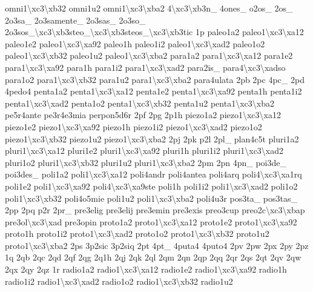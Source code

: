 {omni1\textbackslash{}xc3\textbackslash{}xb32 omni1u2 omni1\textbackslash{}xc3\textbackslash{}xba2 4\textbackslash{}xc3\textbackslash{}xb3n\-\_\- 4ones\-\_\- o2os\-\_\- 2os\-\_\- 2o3sa\-\_\- 2o3samente\-\_\- 2o3sas\-\_\- 2o3so\-\_\- 2o3sos\-\_\textbackslash{}xc3\textbackslash{}xb3steo\-\_\textbackslash{}xc3\textbackslash{}xb3steos\-\_\textbackslash{}xc3\textbackslash{}xb3tic 1p paleo1a2 paleo1\textbackslash{}xc3\textbackslash{}xa12 paleo1e2 paleo1\textbackslash{}xc3\textbackslash{}xa92 paleo1h paleo1i2 paleo1\textbackslash{}xc3\textbackslash{}xad2 paleo1o2 paleo1\textbackslash{}xc3\textbackslash{}xb32 paleo1u2 paleo1\textbackslash{}xc3\textbackslash{}xba2 para1a2 para1\textbackslash{}xc3\textbackslash{}xa12 para1e2 para1\textbackslash{}xc3\textbackslash{}xa92 para1h para1i2 para1\textbackslash{}xc3\textbackslash{}xad2 para2is\-\_\- para4\textbackslash{}xc3\textbackslash{}xadso para1o2 para1\textbackslash{}xc3\textbackslash{}xb32 para1u2 para1\textbackslash{}xc3\textbackslash{}xba2 para4ulata 2pb 2pc 4pc\-\_\- 2pd 4pedo4 penta1a2 penta1\textbackslash{}xc3\textbackslash{}xa12 penta1e2 penta1\textbackslash{}xc3\textbackslash{}xa92 penta1h penta1i2 penta1\textbackslash{}xc3\textbackslash{}xad2 penta1o2 penta1\textbackslash{}xc3\textbackslash{}xb32 penta1u2 penta1\textbackslash{}xc3\textbackslash{}xba2 pe5r4ante pe3r4e3mia perpon5d6r 2pf 2pg 2p1h piezo1a2 piezo1\textbackslash{}xc3\textbackslash{}xa12 piezo1e2 piezo1\textbackslash{}xc3\textbackslash{}xa92 piezo1h piezo1i2 piezo1\textbackslash{}xc3\textbackslash{}xad2 piezo1o2 piezo1\textbackslash{}xc3\textbackslash{}xb32 piezo1u2 piezo1\textbackslash{}xc3\textbackslash{}xba2 2pj 2pk p2l 2pl\-\_\- plan4c5t pluri1a2 pluri1\textbackslash{}xc3\textbackslash{}xa12 pluri1e2 pluri1\textbackslash{}xc3\textbackslash{}xa92 pluri1h pluri1i2 pluri1\textbackslash{}xc3\textbackslash{}xad2 pluri1o2 pluri1\textbackslash{}xc3\textbackslash{}xb32 pluri1u2 pluri1\textbackslash{}xc3\textbackslash{}xba2 2pm 2pn 4pn\-\_\- poi3de\-\_\- poi3des\-\_\- poli1a2 poli1\textbackslash{}xc3\textbackslash{}xa12 poli4andr poli4antea poli4arq poli4\textbackslash{}xc3\textbackslash{}xa1rq poli1e2 poli1\textbackslash{}xc3\textbackslash{}xa92 poli4\textbackslash{}xc3\textbackslash{}xa9ste poli1h poli1i2 poli1\textbackslash{}xc3\textbackslash{}xad2 poli1o2 poli1\textbackslash{}xc3\textbackslash{}xb32 poli4o5mie poli1u2 poli1\textbackslash{}xc3\textbackslash{}xba2 poli4u3r pos3ta\-\_\- pos3tas\-\_\- 2pp 2pq p2r 2pr\-\_\- pre3elig pre3elij pre3emin pre3exis preo3cup preo2c\textbackslash{}xc3\textbackslash{}xbap pre3ol\textbackslash{}xc3\textbackslash{}xad pre3opin proto1a2 proto1\textbackslash{}xc3\textbackslash{}xa12 proto1e2 proto1\textbackslash{}xc3\textbackslash{}xa92 proto1h proto1i2 proto1\textbackslash{}xc3\textbackslash{}xad2 proto1o2 proto1\textbackslash{}xc3\textbackslash{}xb32 proto1u2 proto1\textbackslash{}xc3\textbackslash{}xba2 2ps 3p2sic 3p2siq 2pt 4pt\-\_\- 4puta4 4puto4 2pv 2pw 2px 2py 2pz 1q 2qb 2qc 2qd 2qf 2qg 2q1h 2qj 2qk 2ql 2qm 2qn 2qp 2qq 2qr 2qs 2qt 2qv 2qw 2qx 2qy 2qz 1r radio1a2 radio1\textbackslash{}xc3\textbackslash{}xa12 radio1e2 radio1\textbackslash{}xc3\textbackslash{}xa92 radio1h radio1i2 radio1\textbackslash{}xc3\textbackslash{}xad2 radio1o2 radio1\textbackslash{}xc3\textbackslash{}xb32 radio1u2 }

